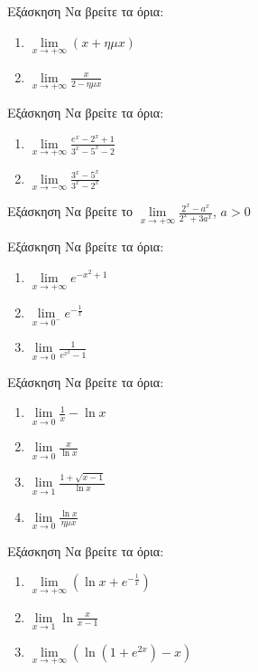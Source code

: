 \documentclass[greek]{beamer}
\begin{document}
\begin{frame}{Εξάσκηση}
 Να βρείτε τα όρια:
 \begin{enumerate}
  \item $\lim\limits_{x \to +\infty}{ (x+ημx) }$ \pause
  \item $\lim\limits_{x \to +\infty}{ \frac{x}{2-ημx}  }$
 \end{enumerate}
\end{frame}

\begin{frame}{Εξάσκηση}
 Να βρείτε τα όρια:
 \begin{enumerate}
  \item $\lim\limits_{x \to +\infty}{ \frac{e^x-2^x+1}{3^x-5^x-2} }$ \pause
  \item $\lim\limits_{x \to -\infty}{ \frac{3^x-5^x}{3^x-2^x}  }$
 \end{enumerate}
\end{frame}

\begin{frame}{Εξάσκηση}
 Να βρείτε το $\lim\limits_{x \to +\infty}{ \frac{2^x-a^x}{2^x+3a^x}  }$, $a>0$
\end{frame}

\begin{frame}{Εξάσκηση}
 Να βρείτε τα όρια:
 \begin{enumerate}
  \item $\lim\limits_{x \to +\infty}{ e^{-x^2+1} }$ \pause
  \item $\lim\limits_{x \to 0^-}{ e^{-\frac{1}{x}} }$\pause
  \item $\lim\limits_{x \to 0}{ \frac{1}{e^{x^2}-1}}$
 \end{enumerate}
\end{frame}

\begin{frame}{Εξάσκηση}
 Να βρείτε τα όρια:
 \begin{enumerate}
  \item $\lim\limits_{x \to 0}{ \frac{1}{x}-\ln x }$ \pause
  \item $\lim\limits_{x \to 0}{ \frac{x}{\ln x} }$\pause
  \item $\lim\limits_{x \to 1}{ \frac{1+\sqrt{x-1}}{\ln x}}$\pause
  \item $\lim\limits_{x \to 0}{ \frac{\ln x}{ημx}}$
 \end{enumerate}
\end{frame}

\begin{frame}{Εξάσκηση}
 Να βρείτε τα όρια:
 \begin{enumerate}
  \item $\lim\limits_{x \to +\infty}{\left(    \ln x + e^{-\frac{1}{x}} \right)}$ \pause
  \item $\lim\limits_{x \to 1}{ \ln\frac{x}{x-1} }$\pause
  \item $\lim\limits_{x \to +\infty}{\left( \ln (1+e^{2x})-x \right)}$
 \end{enumerate}
\end{frame}
\end{document}
